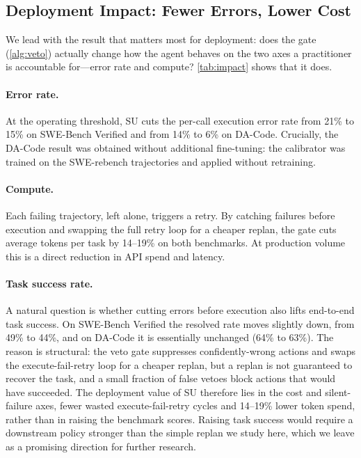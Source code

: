 \documentclass[11pt]{article}
\newcommand{\impNoVetoErrSB}{21}
\newcommand{\impNoVetoErrDA}{14}
\newcommand{\impGatedErrSB}{15}
\newcommand{\impGatedErrDA}{6}
\newcommand{\impTokSaveSB}{14}
\newcommand{\impTokSaveDA}{19}
\newcommand{\impNoVetoSuccSB}{49}
\newcommand{\impNoVetoSuccDA}{64}
\newcommand{\impGatedSuccSB}{44}
\newcommand{\impGatedSuccDA}{63}
\begin{document}
\subsection{Deployment Impact: Fewer Errors, Lower Cost}
\label{sec:impact}

We lead with the result that matters most for deployment: does the gate (\autoref{alg:veto})
actually change how the agent behaves on the two axes a practitioner is accountable for---error
rate and compute? \autoref{tab:impact} shows that it does.

\paragraph{Error rate.}
At the operating threshold, SU cuts the per-call execution error rate from \impNoVetoErrSB\% to \impGatedErrSB\% on SWE-Bench Verified and from \impNoVetoErrDA\% to \impGatedErrDA\% on DA-Code. Crucially, the DA-Code
result was obtained without additional fine-tuning: the calibrator was trained on the SWE-rebench trajectories and applied without retraining.

\paragraph{Compute.}
Each failing trajectory, left alone, triggers a retry. By catching failures before execution and
swapping the full retry loop for a cheaper replan, the gate cuts average tokens per task by
\impTokSaveSB--\impTokSaveDA\% on both benchmarks. At production volume this is a direct reduction in API spend and
latency.

\paragraph{Task success rate.}
A natural question is whether cutting errors before execution also lifts
end-to-end task success. On
SWE-Bench Verified the resolved rate moves slightly down, from
\impNoVetoSuccSB\% to \impGatedSuccSB\%, and on DA-Code it is essentially unchanged
(\impNoVetoSuccDA\% to \impGatedSuccDA\%). The reason is structural: the veto gate
suppresses confidently-wrong actions and swaps the execute-fail-retry loop
for a cheaper replan, but a replan is not guaranteed to recover the task,
and a small fraction of false vetoes block actions that would have
succeeded. The deployment value of SU therefore lies in the cost and
silent-failure axes, fewer wasted execute-fail-retry cycles and
\impTokSaveSB--\impTokSaveDA\% lower token spend, rather than in raising the benchmark
scores. Raising task success would require a downstream policy stronger than the simple replan we study here, which we leave as a promising direction for
further research.
\end{document}
